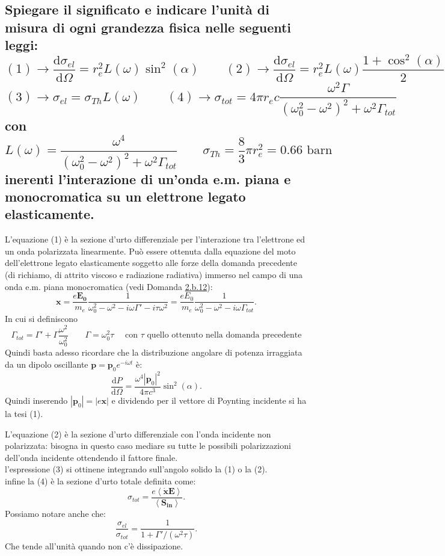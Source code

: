 \subsection[$\ $ Significato fisico della Breight-Wiegner]{Spiegare il significato e indicare l'unità di misura di ogni grandezza fisica nelle seguenti leggi:
\[
	\left( 1 \right) \to \frac{\mbox{d} \sigma_{el}}{\mbox{d} \Omega} = r_{e}^2 L \left( \omega \right)  \sin^2 \left( \alpha \right)   \quad \quad
	\left( 2 \right) \to  \frac{\mbox{d} \sigma_{el}}{\mbox{d} \Omega} = r_{e}^2 L \left( \omega \right)  \frac{1 + \cos^2 \left( \alpha \right) }{2}   
\]
\[
	\left( 3 \right) \to  \sigma_{el} = \sigma_{Th} L \left( \omega \right) \quad \quad 
	\left( 4 \right) \to  \sigma_{tot} = 4 \pi r_{e} c \frac{\omega^2 \Gamma }{\left( \omega_{0}^2 - \omega^2 \right)^2 + \omega^2 \Gamma_{tot} } 
\] 
con 
\[
	L \left( \omega \right) = \frac{\omega^4}{\left( \omega_{0}^2 - \omega^2 \right)^2 + \omega^2 \Gamma_{tot} } \quad \quad 
	\sigma_{Th} = \frac{8}{3} \pi r_{e}^2 = 0.66 \text{ barn}
\]
inerenti l'interazione di un’onda e.m. piana e monocromatica su un elettrone legato elasticamente.} \label{subsec: 2.a.16}
L'equazione (1) è la sezione d'urto differenziale per l'interazione tra l'elettrone ed un onda polarizzata linearmente. Può essere ottenuta dalla equazione del moto dell'elettrone legato elasticamente soggetto alle forze della domanda precedente (di richiamo, di attrito viscoso e radiazione radiativa) immerso nel campo di una onda e.m. piana monocromatica (vedi Domanda \hyperref[subsec: 2.b.12]{2.b.12}):
\[
	\boldsymbol{x} = \frac{e \boldsymbol{E_0}}{m_e}\frac{1}{\omega_0^2-\omega^2- i\omega \Gamma' - i \tau \omega^2} = \frac{eE_0}{m_e}\frac{1}{\omega_0^2-\omega^2- i\omega\Gamma_{tot}}
.\] 
In cui si definiscono 
\[
	\Gamma_{tot} = \Gamma' + \Gamma \frac{\omega^2}{\omega_0^2} \quad \quad 
	\Gamma = \omega_0^2 \tau \quad \text{ con $\tau$ quello ottenuto nella domanda precedente}
\]
Quindi basta adesso ricordare che la distribuzione angolare di potenza irraggiata da un dipolo oscillante $ \boldsymbol{p} = \boldsymbol{p}_0 e^{-i\omega t}$ è:
\[
	\frac{\mbox{d} P}{\mbox{d} \Omega} = \frac{\omega^{4} \left| \boldsymbol{p}_0 \right|^2 }{4\pi c^3} \sin^2\left( \alpha \right) 
.\] 
Quindi inserendo $\left| \boldsymbol{p}_0 \right| = \left| e \boldsymbol{x} \right| $  e dividendo per il vettore di Poynting incidente si ha la tesi (1).

L'equazione (2) è la sezione d'urto differenziale con l'onda incidente non polarizzata: bisogna in questo caso mediare su tutte le possibili polarizzazioni dell'onda incidente ottendendo il fattore finale.\\
l'espressione (3) si ottinene integrando sull'angolo solido la (1) o la (2).\\
infine la (4) è la sezione d'urto totale definita come:
\[
	\sigma_{tot} = \frac{e \left< \dot{\boldsymbol{x}}\boldsymbol{E}\right>}{\left<\boldsymbol{S_{in}} \right>}
.\]
Possiamo notare anche che:
\[
	\frac{\sigma_{el}}{\sigma_{tot}} = \frac{1}{1 + \Gamma'/\left( \omega^2\tau \right)  }
.\] 
Che tende all'unità quando non c'è dissipazione.

